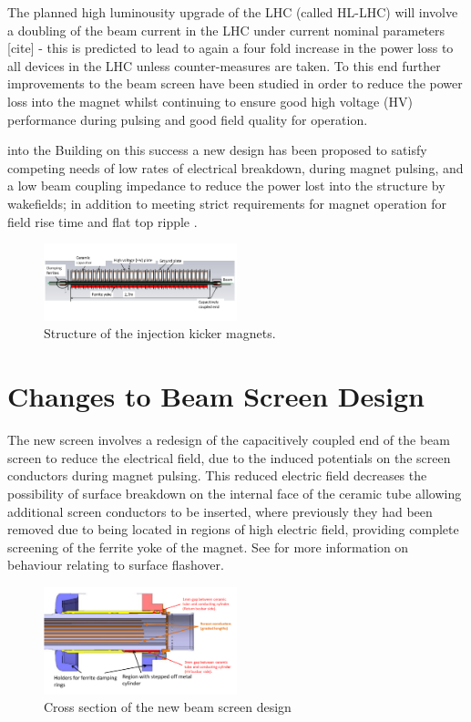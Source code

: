 \documentclass[a4paper,
              ]{jacow}
\begin{document}
The planned high luminousity upgrade of the LHC (called HL-LHC) will involve a doubling of the beam current in the LHC under current nominal parameters [cite] - this is predicted to lead to again a four fold increase in the power loss to all devices in the LHC unless counter-measures are taken. To this end further improvements to the beam screen have been studied in order to reduce the power loss into the magnet whilst continuing to ensure good high voltage (HV) performance during pulsing and good field quality for operation.


into the   \cite{mki-heatingTemp}
Building on this success a new design has been proposed to satisfy competing needs of low rates of electrical breakdown, during magnet pulsing, and a low beam coupling impedance to reduce the power lost into the structure by wakefields; in addition to meeting strict requirements for magnet operation for field rise time and flat top ripple \cite{mkiUpgrade}. 

\begin{figure}
\includegraphics[width=0.5\textwidth]{MKICrossSectionYZ.pdf}
\caption{Structure of the injection kicker magnets.}
\label{fig:mkiStruct}
\end{figure}

\section{Changes to Beam Screen Design}

The new screen involves a redesign of the capacitively coupled end of the beam screen to reduce the electrical field, due to the induced potentials on the screen conductors during magnet pulsing. This reduced electric field decreases the possibility of surface breakdown on the internal face of the ceramic tube allowing additional screen conductors to be inserted, where previously they had been removed due to being located in regions of high electric field, providing complete screening of the ferrite yoke of the magnet. See \cite{mki-ElecBreakdown} for more information on behaviour relating to surface flashover. 

\begin{figure}
\begin{center}
\includegraphics[width=0.5\textwidth]{beamScreenCrossSectionLabelled.pdf}
\caption{Cross section of the new beam screen design}
\label{fig:beamScreenCross}
\end{center}
\end{figure}
\end{document}
